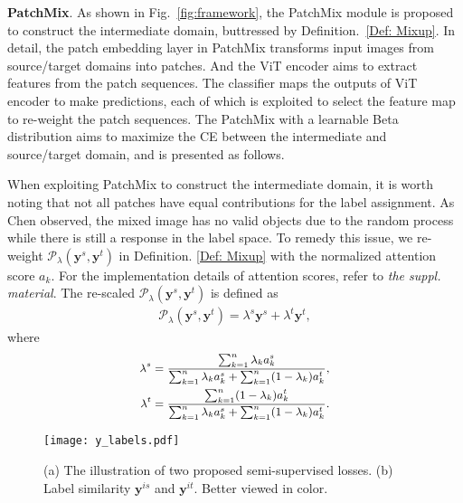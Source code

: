 \documentclass[10pt,twocolumn,letterpaper, ]{article}
\begin{document}
\noindent \textbf{PatchMix}.
As shown in Fig.~\ref{fig:framework}, the PatchMix module is proposed to construct the intermediate domain, buttressed by Definition.~\ref{Def: Mixup}. In detail, the patch embedding layer in PatchMix transforms input images from source/target domains into patches. And the ViT encoder aims to extract features from the patch sequences. The classifier maps the outputs of ViT encoder to make predictions, each of which is exploited to select the feature map to re-weight the patch sequences. The PatchMix with a learnable Beta distribution aims to maximize the CE between the intermediate and source/target domain, and is presented as follows.

When exploiting PatchMix to construct the intermediate domain, it is worth noting that not all patches have equal contributions for the label assignment. As Chen \etal\cite{DBLP:journals/corr/abs-2111-09833} observed, the mixed image has no valid objects due to the random process while there is still a response in the label space. 
To remedy this issue, we re-weight $\mathcal{P}_\lambda(\boldsymbol{y}^s, \boldsymbol{y}^t)$ in Definition. \ref{Def: Mixup} with the normalized attention score $a_{k}$. For the implementation details of attention scores, refer to \textit{the suppl. material}. The re-scaled $\mathcal{P}_\lambda(\boldsymbol{y}^s, \boldsymbol{y}^t)$ is defined as 
{\setlength\abovedisplayskip{3pt}
\setlength\belowdisplayskip{3pt}
\begin{equation}
    \begin{aligned}
    \mathcal{P}_\lambda(\boldsymbol{y}^s, \boldsymbol{y}^t) = \lambda^s\boldsymbol{y}^s + \lambda^t\boldsymbol{y}^t, \nonumber
    \end{aligned}
\end{equation} }
where
{\setlength\abovedisplayskip{5pt}
\setlength\belowdisplayskip{3pt}
\begin{equation}
\small
    \begin{aligned}
\lambda^s &= \frac{\sum_{k=1}^{n} \lambda_{k} {a}_{k}^{s}}{\sum_{k=1}^{n} \lambda_{k} {a}_{k}^{s}+\sum_{k=1}^{n}(1-\lambda_{k}){a}_{k}^{t}}
, \\
\lambda^t &= \frac{\sum_{k=1}^{n}(1-\lambda_{k}) {a}_{k}^{t}}{\sum_{k=1}^{n} \lambda_{k} {a}_{k}^{s}+\sum_{k=1}^{n}(1-\lambda_{k}){a}_{k}^{t}}.\nonumber
    \end{aligned}
\end{equation}}
\begin{figure}
    \centering
    \texttt{[image: y\_labels.pdf]}
    \captionsetup{font=small}
    \vspace{-15pt}
    \caption{(a) The illustration of two proposed semi-supervised losses. (b) Label similarity $\boldsymbol{y}^{is}$ and $\boldsymbol{y}^{it}$. Better viewed in color.}
    \label{fig:align-feature}
    \vspace{-15pt}
\end{figure}
\end{document}
